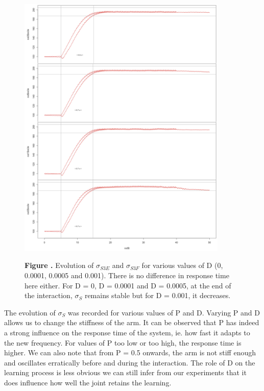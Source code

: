 \documentclass{report}
\begin{document}
\begin{figure}[h!]
\begin{center}
\includegraphics[width=10cm]{figures/varying_D-ss3.png}
\end{center}
 \textbf{\label{fig:05} Figure . }{Evolution of $\sigma_{S3E}$ and $\sigma_{S3F}$  for various values of D (0, 0.0001, 0.0005 and 0.001). There is no difference in response time here either. For D = 0, D = 0.0001 and D = 0.0005, at the end of the interaction, $\sigma_S$ remains stable but for D = 0.001, it decreases.}
\end{figure}

The evolution of $\sigma_S$ was recorded for various values of P and D. Varying P and D allows us to change the stiffness of the arm. It can be observed that P has indeed a strong influence on the response time of the system, ie. how fast it adapts to the new frequency. For values of P too low or too high, the response time is higher. We can also note that from P = 0.5 onwards, the arm is not stiff enough and oscillates erratically before and during the interaction. The role of D on the learning process is less obvious we can still infer from our experiments that it does influence how well the joint retains the learning.
\end{document}
